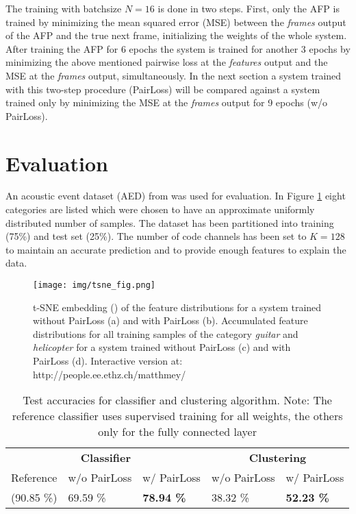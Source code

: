 \documentclass{article} %
\begin{document}
The training with batchsize $N=16$ is done in two steps. First, only the AFP is trained by minimizing the mean squared error (MSE) between the \emph{frames} output of the AFP and the true next frame, initializing the weights of the whole system. After training the AFP for 6 epochs the system is trained for another 3 epochs by minimizing the above mentioned pairwise loss at the \emph{features} output and the MSE at the \emph{frames} output, simultaneously. In the next section a system trained with this two-step procedure (PairLoss) will be compared against a system trained only by minimizing the MSE at the \emph{frames} output for 9 epochs (w/o PairLoss).

\section{Evaluation}
An acoustic event dataset (AED) from \cite{takahashi_deep_2016} was used for evaluation. In Figure \ref{fig_tsne} eight categories are listed which were chosen to have an approximate uniformly distributed number of samples. The dataset has been partitioned into training (75\%) and test set (25\%). The number of code channels has been set to $K=128$ to maintain an accurate prediction and to provide enough features to explain the data.

\begin{figure}[h]
	\begin{center}
		\texttt{[image: img/tsne\_fig.png]}
	\end{center}
	\caption{t-SNE embedding (\cite{maaten_visualizing_2008}) of the feature distributions for a system trained without PairLoss (a) and with PairLoss (b). Accumulated feature distributions for all training samples of the category \emph{guitar} and \emph{helicopter} for a system trained without PairLoss (c) and with PairLoss (d). Interactive version at: http://people.ee.ethz.ch/matthmey/  }
	\label{fig_tsne}
\end{figure}

\begin{table}[h]
\caption{Test accuracies for classifier and clustering algorithm. Note: The reference classifier uses supervised training for all weights, the others only for the fully connected layer}
\label{tab_acc}
\begin{center}
\begin{tabular}{lll|ll}
\multicolumn{3}{c|}{\bf Classifier} & \multicolumn{2}{c}{\bf Clustering} \\
Reference & w/o PairLoss & w/ PairLoss & w/o PairLoss & w/ PairLoss
\\ \hline
(90.85 \%) & 69.59 \% & \bf 78.94  \% & 38.32 \% & \bf 52.23 \% \\

\end{tabular}
\end{center}
\end{table}
\end{document}
